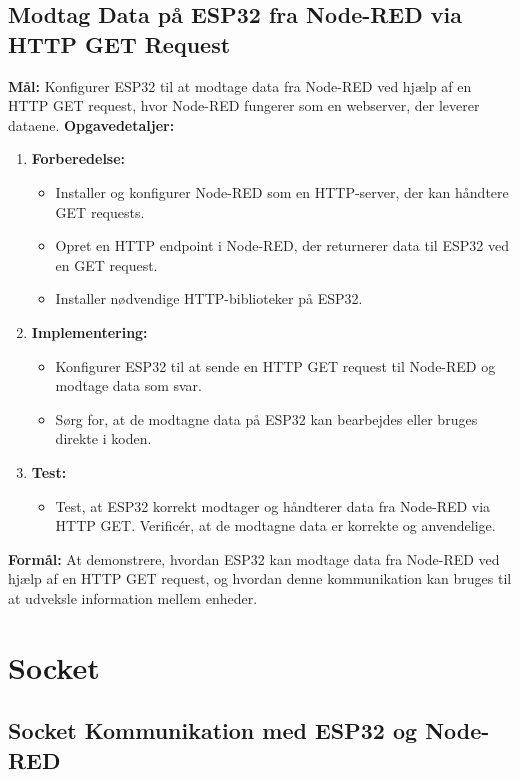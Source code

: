 \subsection*{Modtag Data på ESP32 fra Node-RED via HTTP GET Request}
\textbf{Mål:} Konfigurer ESP32 til at modtage data fra Node-RED ved hjælp af en HTTP GET request, hvor Node-RED fungerer som en webserver, der leverer dataene.
\newline\newline\noindent
\textbf{Opgavedetaljer:}
\begin{enumerate}
	\item \textbf{Forberedelse:}
	\begin{itemize}
		\item Installer og konfigurer Node-RED som en HTTP-server, der kan håndtere GET requests.
		\item Opret en HTTP endpoint i Node-RED, der returnerer data til ESP32 ved en GET request.
		\item Installer nødvendige HTTP-biblioteker på ESP32.
	\end{itemize}
	\item \textbf{Implementering:}
	\begin{itemize}
		\item Konfigurer ESP32 til at sende en HTTP GET request til Node-RED og modtage data som svar.
		\item Sørg for, at de modtagne data på ESP32 kan bearbejdes eller bruges direkte i koden.
	\end{itemize}
	\item \textbf{Test:}
	\begin{itemize}
		\item Test, at ESP32 korrekt modtager og håndterer data fra Node-RED via HTTP GET. Verificér, at de modtagne data er korrekte og anvendelige.
	\end{itemize}
\end{enumerate}
\textbf{Formål:} At demonstrere, hvordan ESP32 kan modtage data fra Node-RED ved hjælp af en HTTP GET request, og hvordan denne kommunikation kan bruges til at udveksle information mellem enheder.

\section{Socket}
\subsection*{Socket Kommunikation med ESP32 og Node-RED}
